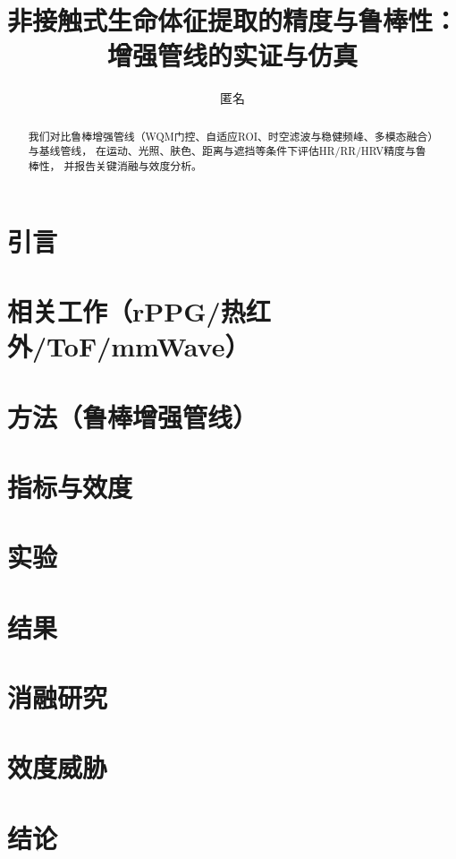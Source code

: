 \documentclass[UTF8]{ctexart}
\title{非接触式生命体征提取的精度与鲁棒性：增强管线的实证与仿真}
\author{匿名}
\date{}
\begin{document}
\maketitle

\begin{abstract}
我们对比鲁棒增强管线（WQM门控、自适应ROI、时空滤波与稳健频峰、多模态融合）与基线管线，
在运动、光照、肤色、距离与遮挡等条件下评估HR/RR/HRV精度与鲁棒性，
并报告关键消融与效度分析。
\end{abstract}

\section{引言}
\section{相关工作（rPPG/热红外/ToF/mmWave）}
\section{方法（鲁棒增强管线）}
\section{指标与效度}
\section{实验}
\section{结果}
\section{消融研究}
\section{效度威胁}
\section{结论}



\end{document}

